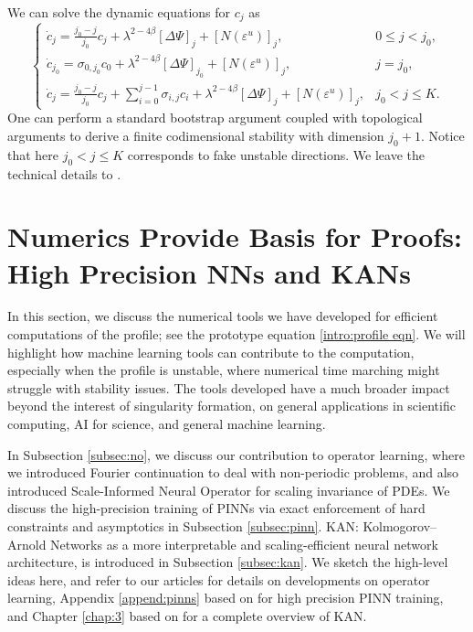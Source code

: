 \documentclass[12pt]{caltech_thesis}
\numberwithin{equation}{section}
\begin{document}
We can solve the dynamic equations for $c_j$ as
$$\begin{cases}
    \dot c_j =\frac{j_0 -j}{j_0} c_j + \lambda^{2-4 \beta} [\Delta \Psi]_j +  [N(\varepsilon^u)]_{j}, & 0 \le j < j_0, \\
    \dot c_{j_0} =  \sigma_{0,j_0}c_0 +\lambda^{2-4 \beta} [\Delta \Psi]_{j_0}  +
    [N(\varepsilon^u)]_j
    , & j =j_0, \\
    \dot c_{j} =  \frac{j_0 -j}{j_0} c_j + \sum_{i=0}^{j-1} \sigma_{i,j} c_i + \lambda^{2-4 \beta} [\Delta \Psi]_{j}  + [N(\varepsilon^u)]_j, & j_0 < j \le K.
\end{cases}$$
One can perform a standard bootstrap argument coupled with topological arguments to derive a finite codimensional stability with dimension $j_0+1$. Notice that here $j_0 < j \le K$ corresponds to fake unstable directions. We leave the technical details to \cite{liu2025finite}.
\section{Numerics Provide Basis for Proofs: High Precision NNs and KANs}\label{sec:num2}
In this section, we discuss the numerical tools we have developed for efficient computations of the profile; see the prototype equation \eqref{intro:profile eqn}. We will highlight how machine learning tools can contribute to the computation, especially when the profile is unstable, where numerical time marching might struggle with stability issues. The tools developed have a much broader impact beyond the interest of singularity formation, on general applications in scientific computing,
AI for science, and general machine learning.

In Subsection \ref{subsec:no}, we discuss our contribution to operator learning, where we introduced Fourier continuation to deal with non-periodic problems, and also introduced Scale-Informed Neural Operator for scaling invariance of PDEs. We discuss the high-precision training of PINNs via exact enforcement of hard constraints and asymptotics in Subsection \ref{subsec:pinn}. KAN: Kolmogorov–Arnold Networks as a more interpretable and scaling-efficient neural network architecture, is introduced in Subsection \ref{subsec:kan}. 
We sketch the high-level ideas here, and refer to our articles \cite{maust2022fourier,li2024scale} for details on developments on operator learning, Appendix \ref{append:pinns} based on \cite{wang2025high} for high precision PINN training, and Chapter \ref{chap:3} based on \cite{kan1,liu2024kan,kanbias} for a complete overview of KAN.
\end{document}
